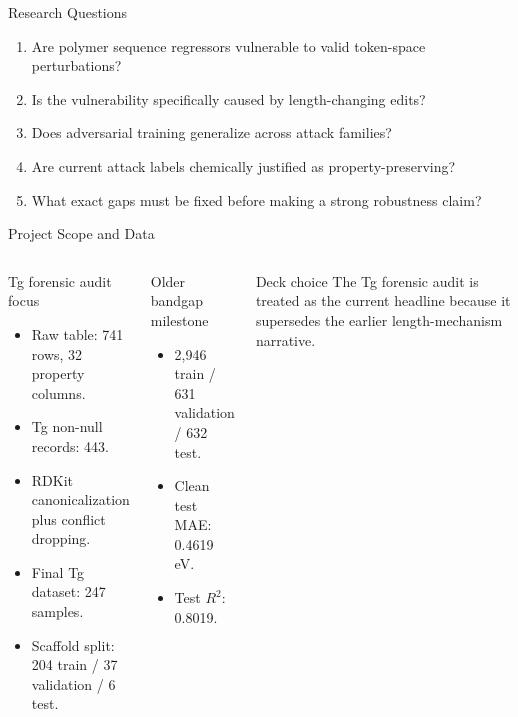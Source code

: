 \documentclass[aspectratio=169,10pt]{beamer}
\begin{document}
\begin{frame}{Research Questions}
\begin{enumerate}
  \item Are polymer sequence regressors vulnerable to valid token-space perturbations?
  \item Is the vulnerability specifically caused by length-changing edits?
  \item Does adversarial training generalize across attack families?
  \item Are current attack labels chemically justified as property-preserving?
  \item What exact gaps must be fixed before making a strong robustness claim?
\end{enumerate}
\end{frame}

\begin{frame}{Project Scope and Data}
\begin{columns}[T,totalwidth=\textwidth]
\begin{block}{Tg forensic audit focus}
\begin{itemize}
  \item Raw table: 741 rows, 32 property columns.
  \item Tg non-null records: 443.
  \item RDKit canonicalization plus conflict dropping.
  \item Final Tg dataset: 247 samples.
  \item Scaffold split: 204 train / 37 validation / 6 test.
\end{itemize}
\end{block}
\begin{block}{Older bandgap milestone}
\begin{itemize}
  \item 2,946 train / 631 validation / 632 test.
  \item Clean test MAE: 0.4619 eV.
  \item Test $R^2$: 0.8019.
\end{itemize}
\end{block}
\begin{alertblock}{Deck choice}
The Tg forensic audit is treated as the current headline because it supersedes the earlier length-mechanism narrative.
\end{alertblock}
\end{columns}
\end{frame}
\end{document}
